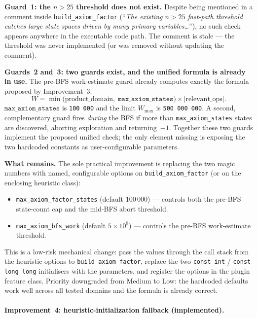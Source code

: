 \documentclass[11pt,a4paper]{article}
\begin{document}
\textbf{Guard~1: the $n>25$ threshold does not exist.}
Despite being mentioned in a comment inside \texttt{build\_axiom\_factor}
(``\emph{The existing $n>25$ fast-path threshold catches large state spaces
driven by many primary variables\ldots}''), no such check appears anywhere in
the executable code path.  The comment is stale --- the threshold was never
implemented (or was removed without updating the comment).

\textbf{Guards~2 and~3: two guards exist, and the unified formula is already
in use.}
The pre-BFS work-estimate guard already computes exactly the formula proposed
by Improvement~3:
\[
W = \min\!\bigl(\text{product\_domain},\;
               \texttt{max\_axiom\_states}\bigr)
  \times \lvert\text{relevant\_ops}\rvert.
\]
$\texttt{max\_axiom\_states}$ is \texttt{100\,000} and the limit
$W_{\max}$ is \texttt{500\,000\,000}.  A second, complementary guard fires
\emph{during} the BFS if more than \texttt{max\_axiom\_states} states are
discovered, aborting exploration and returning~$-1$.  Together these two
guards implement the proposed unified check; the only element missing is
exposing the two hardcoded constants as user-configurable parameters.

\textbf{What remains.}
The sole practical improvement is replacing the two magic numbers with
named, configurable options on \texttt{build\_axiom\_factor} (or on the
enclosing heuristic class):
\begin{itemize}
  \item \texttt{max\_axiom\_factor\_states} (default 100\,000) --- controls
    both the pre-BFS state-count cap and the mid-BFS abort threshold.
  \item \texttt{max\_axiom\_bfs\_work} (default $5\times10^8$) --- controls
    the pre-BFS work-estimate threshold.
\end{itemize}
This is a low-risk mechanical change: pass the values through the call stack
from the heuristic options to \texttt{build\_axiom\_factor}, replace the two
\texttt{const int} / \texttt{const long long} initialisers with the parameters,
and register the options in the plugin feature class.  Priority downgraded
from Medium to Low: the hardcoded defaults work well across all tested
domains and the formula is already correct.

\paragraph{Improvement~4: heuristic-initialization fallback
(implemented).}
\end{document}
